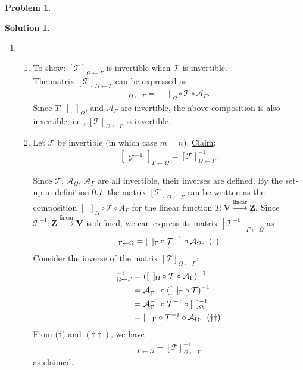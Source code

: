 \documentclass{article}
\theoremstyle{definition}
\newtheorem*{prob*}{Problem}
\newtheorem*{sln*}{Solution}
\newcommand{\V}{\mathbf{V}}
\newcommand{\Z}{\mathbf{Z}}
\newcommand{\lin}{\overset{\text{linear}}{\longrightarrow}}
\newcommand{\T}{\mathcal{T}}
\begin{document}
\begin{prob*}
\begin{sln*}
\begin{enumerate}
			
			
			
			
			\item 
			\begin{enumerate}
			\item \underline{To show}: $[\T]_{\Omega\leftarrow\Gamma}$ is invertible when $\T$ is invertible.\\
				
			The matrix $[\T]_{\Omega\leftarrow\Gamma}$ can be expressed as 
			\begin{align*}
			[\T]_{\Omega\leftarrow\Gamma} = [\,\,\,]_{\Omega}\circ \T \circ \mathcal{A}_{\Gamma}.
			\end{align*}
			Since $T$, $[\,\,\,]_\Omega$, and $\mathcal{A}_\Gamma$ are invertible, the above composition is also invertible, i.e., $[\T]_{\Omega\leftarrow\Gamma}$ is invertible. \\
			
			\item Let $\T$ be invertible (in which case $m=n$). \underline{Claim}:
			\begin{align*}
			\begin{bmatrix}
			\mathcal{T}^{-1}
			\end{bmatrix}_{\Gamma\leftarrow\Omega} = [\mathcal{T}]^{-1}_{\Omega\leftarrow \Gamma}.
			\end{align*}
			
			Since $\T$, $\mathcal{A}_{\Omega}$, $\mathcal{A}_\Gamma$ are all invertible, their inverses are defined. By the set-up in definition 0.7, the matrix $[\T]_{\Omega\leftarrow\Gamma}$ can be written as the composition $[\,\,\,]_\Omega \circ \T \circ A_{\Gamma}$ for the linear function $T : \V \lin \Z$. Since $\T^{-1} : \Z \lin \V$ is defined, we can express its matrix $[\T^{-1}]_{\Gamma\leftarrow\Omega}$ as
			\begin{align*}
			[\T^{-1}]_{\Gamma\leftarrow\Omega} = [\,\,\,]_\Gamma\circ \T^{-1} \circ \mathcal{A}_\Omega.\hspace{0.2cm}(\dagger)
			\end{align*}
			Consider the inverse of the matrix $[\T]_{\Omega\leftarrow\Gamma}$:
			\begin{align*}
			[\T]^{-1}_{\Omega\leftarrow\Gamma} &= \left([\,\,\,]_\Omega\circ \T \circ \mathcal{A}_\Gamma \right)^{-1}\\
			&= \mathcal{A}^{-1}_\Gamma \circ \left( [\,\,\,]_\Gamma \circ \T \right)^{-1}\\
			&= \mathcal{A}^{-1}_\Gamma \circ \T^{-1} \circ [\,\,\,]_\Omega^{-1}\\
			&= [\,\,\,]_\Gamma \circ \T^{-1} \circ \mathcal{A}_\Omega.\hspace{0.2cm}(\dagger\dagger)
			\end{align*}
			From ($\dagger$) and $(\dagger\dagger)$, we have
			\begin{align*}
				[\T^{-1}]_{\Gamma\leftarrow\Omega} = [\T]^{-1}_{\Omega\leftarrow\Gamma}
			\end{align*}
			as claimed.
			

\end{enumerate}
\end{enumerate}
\end{sln*}
\end{prob*}
\end{document}
